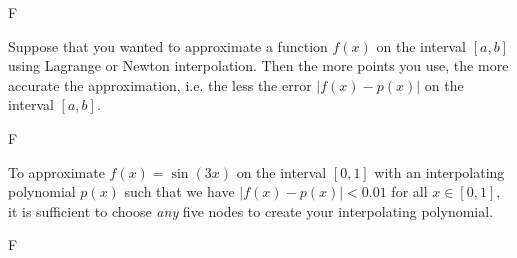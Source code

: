\documentclass[11pt,letterpaper]{article}
\begin{document}
F


Suppose that you wanted to approximate a function $f(x)$ on the interval $[a, b]$ using Lagrange or Newton interpolation. Then the more points you use, the more accurate the approximation, i.e. the less the error $|f(x) - p(x)|$ on the interval $[a, b]$. 

F



To approximate $f(x)= \sin(3x)$ on the interval $[0, 1]$ with an interpolating polynomial $p(x)$ such that we have $|f(x) - p(x)| < 0.01$ for all $x \in [0, 1]$, it is sufficient to choose \textit{any} five nodes to create your interpolating polynomial. 

F
\end{document}
